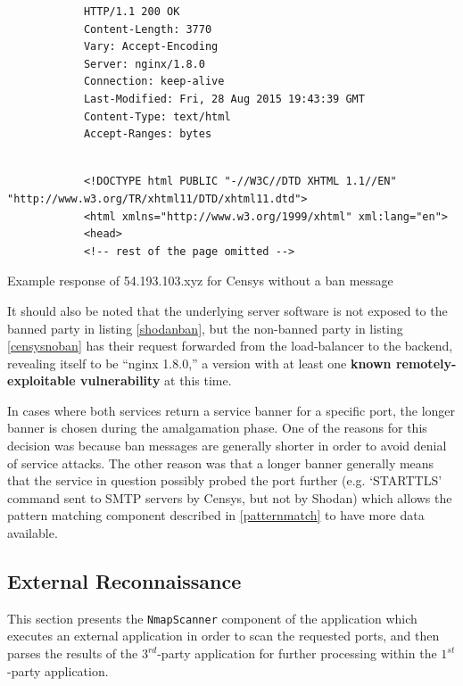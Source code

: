 \documentclass[a4paper,12pt]{article}
\begin{document}
	\begin{listing}[H]
		\begin{verbatim}
			HTTP/1.1 200 OK
			Content-Length: 3770
			Vary: Accept-Encoding
			Server: nginx/1.8.0
			Connection: keep-alive
			Last-Modified: Fri, 28 Aug 2015 19:43:39 GMT
			Content-Type: text/html
			Accept-Ranges: bytes
		\end{verbatim}
		\vspace{-5pt}
		\begin{verbatim}
			 
			<!DOCTYPE html PUBLIC "-//W3C//DTD XHTML 1.1//EN" "http://www.w3.org/TR/xhtml11/DTD/xhtml11.dtd">
			<html xmlns="http://www.w3.org/1999/xhtml" xml:lang="en">
			<head>
			<!-- rest of the page omitted -->
		\end{verbatim}
		\caption{Example response of 54.193.103.xyz for Censys without a ban message}
		\label{censysnoban}
	\end{listing}

	It should also be noted that the underlying server software is not exposed to the banned party in listing \ref{shodanban}, but the non-banned party in listing \ref{censysnoban} has their request forwarded from the load-balancer to the backend, revealing itself to be ``nginx 1.8.0,'' a version with at least one \textbf{known remotely-exploitable vulnerability}\cite{nginxcve} at this time.

	In cases where both services return a service banner for a specific port, the longer banner is chosen during the amalgamation phase. One of the reasons for this decision was because ban messages are generally shorter\cite{qualys11} in order to avoid denial of service attacks. The other reason was that a longer banner generally means that the service in question possibly probed the port further (e.g. `STARTTLS' command sent to SMTP servers by Censys, but not by Shodan) which allows the pattern matching component described in \ref{patternmatch} to have more data available.

\subsection{External Reconnaissance} \label{nmapscan}
 

	This section presents the \texttt{NmapScanner} component of the application which executes an external application in order to scan the requested ports, and then parses the results of the $3^{rd}$-party application for further processing within the $1^{st}$-party application.
	
\end{document}

